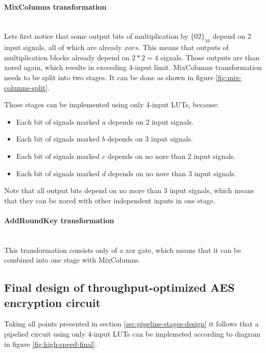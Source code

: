 \paragraph{MixColumns transformation}\mbox{}\\
Lets first notice that some output bits of multiplication by $\{02\}_{16}$ depend on 2 input signals, all of which are already $xors$. This means that outputs of multiplication blocks already depend on $2 * 2 = 4$ signals. Those outputs are than xored again, which results in exceeding 4-input limit. MixColumns transformation needs to be split into two stages. It can be done as shown in figure \ref{fig:mix-columns-split}.


Those stages can be implemented using only 4-input LUTs, because:
\begin{itemize}
\item Each bit of signals marked $a$ depends on 2 input signals.
\item Each bit of signals marked $b$ depends on 3 input signals.
\item Each bit of signals marked $c$ depends on no nore than 2 input signals.
\item Each bit of signals marked $d$ depends on no nore than 3 input signals.
\end{itemize}

Note that all output bits depend on no more than 3 input signals, which means that they can be xored with other independent inputs in one stage.

\paragraph{AddRoundKey transformation}\mbox{}\\
This transformation consists only of a xor gate, which means that it can be combined into one stage with MixColumns.


\subsection{Final design of throughput-optimized AES encryption circuit}
Taking all points presented in section \ref{sec:pipeline-stages-design} it follows that a pipelied circuit using only 4-input LUTs can be implemeted according to diagram in figure \ref{fig:high-speed-final}.

